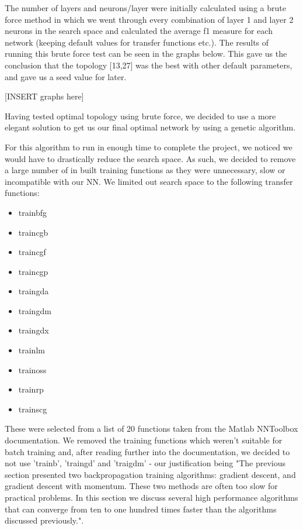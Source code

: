 \documentclass[11pt]{article}
\begin{document}
The number of layers and neurons/layer were initially calculated using a brute force method in which we went through every combination of layer 1 and layer 2 neurons in the search space and calculated the average f1 measure for each network (keeping default values for transfer functions etc.). The results of running this brute force test can be seen in the graphs below. This gave us the conclusion that the topology [13,27] was the best with other default parameters, and gave us a seed value for later.

[INSERT graphs here]

Having tested optimal topology using brute force, we decided to use a more elegant solution to get us our final optimal network by using a genetic algorithm.

For this algorithm to run in enough time to complete the project, we noticed we would have to drastically reduce the search space. As such, we decided to remove a large number of in built training functions as they were unnecessary, slow or incompatible with our NN.
We limited out search space to the following transfer functions:
\begin{multicols}{2}
\begin{itemize}
  \item trainbfg
  \item traincgb
  \item traincgf
  \item traincgp
  \item traingda
  \item traingdm
  \item traingdx
  \item trainlm
  \item trainoss
  \item trainrp
  \item trainscg 
\end{itemize}
\end{multicols}

These were selected from a list of 20 functions taken from the Matlab NNToolbox documentation. We removed the training functions which weren't suitable for batch training and, after reading further into the documentation, we decided to not use 'trainb', 'traingd' and 'traigdm' - our justification being "The previous section presented two backpropagation training algorithms: gradient descent, and gradient descent with momentum. These two methods are often too slow for practical problems. In this section we discuss several high performance algorithms that can converge from ten to one hundred times faster than the algorithms discussed previously.".
\end{document}
